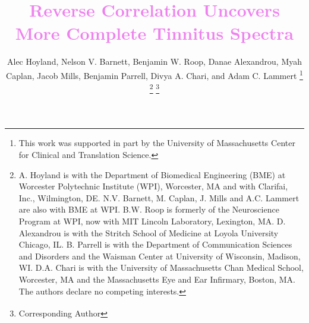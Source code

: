 \documentclass[journal]{IEEEtran}
\begin{document}
%
\title{\textcolor{violet}{Reverse Correlation Uncovers More Complete Tinnitus Spectra \vspace{0.25cm}}}

%
%
%

\author{Alec Hoyland, Nelson V. Barnett, Benjamin W. Roop, Danae Alexandrou, Myah Caplan, Jacob Mills, Benjamin Parrell, Divya A. Chari, and Adam C. Lammert\textsuperscript{\textdagger{}}%
\thanks{This work was supported in part by the University of Massachusetts
Center for Clinical and Translation Science.}%
\thanks{A. Hoyland is with the Department of Biomedical Engineering (BME)
at Worcester Polytechnic Institute (WPI), Worcester, MA and with Clarifai, Inc., Wilmington, DE.
N.V. Barnett, M. Caplan, J. Mills and A.C. Lammert are also with BME at WPI.
B.W. Roop is formerly of the Neuroscience Program at WPI, now with  MIT Lincoln Laboratory, Lexington, MA.
D. Alexandrou is with the Stritch School of Medicine at Loyola University Chicago, IL.
B. Parrell is with the Department of Communication Sciences and Disorders and the Waisman Center at University of Wisconsin, Madison, WI. D.A. Chari is with the
University of Massachusetts Chan Medical School, Worcester, MA
and the Massachusetts Eye and Ear Infirmary,
Boston, MA.
The authors declare no competing interests.}%
\thanks{\textsuperscript{\textdagger{}} Corresponding Author}}%
\end{document}
